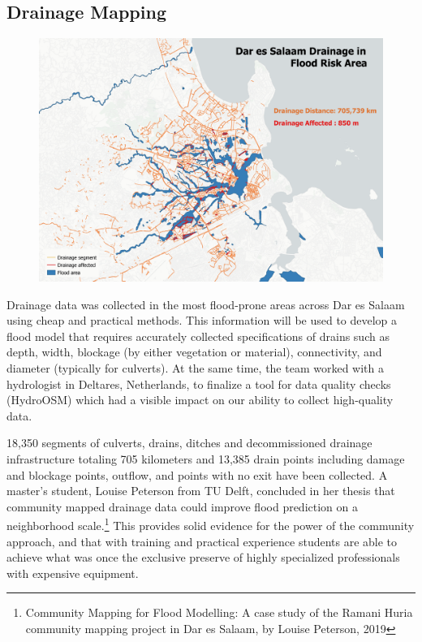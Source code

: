 \documentclass[a4paper,12pt,twoside]{article}
\begin{document}
\subsection{Drainage Mapping}
\begin{figure}[h]
    \centering
    \includegraphics[width=.8\textwidth]{images/drainmap_min.png}
    \label{fig:my_label}
\end{figure}
Drainage data was collected in the most flood-prone areas across Dar es Salaam using cheap and practical methods. This information will be used to develop a flood model that requires accurately collected specifications of drains such as depth, width, blockage (by either vegetation or material), connectivity, and diameter (typically for culverts). At the same time, the team worked with a hydrologist in Deltares, Netherlands, to finalize a tool for data quality checks (HydroOSM) which had a visible impact on our ability to collect high-quality data. 

18,350 segments of culverts, drains, ditches and decommissioned drainage infrastructure totaling 705 kilometers and 13,385 drain points including damage and blockage points, outflow, and points with no exit have been collected. A master’s student, Louise Peterson from TU Delft, concluded in her thesis that community mapped drainage data could improve flood prediction on a neighborhood scale.\footnote{ Community Mapping for Flood Modelling: A case study of the Ramani Huria community mapping project in Dar es Salaam, by Louise Peterson, 2019} This provides solid evidence for the power of the community approach, and that with training and practical experience students are able to achieve what was once the exclusive preserve of highly specialized professionals with expensive equipment. 

\newpage
\end{document}
